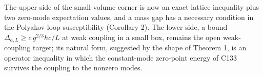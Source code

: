 \documentclass[11pt,a4paper]{article}
\begin{document}
The upper side of the small-volume corner is now an exact lattice
inequality plus two zero-mode expectation values, and a mass gap has a
necessary condition in the Polyakov-loop susceptibility (Corollary 2).
The lower side, a bound \(\Delta_{a,L}\ge c\,g^{2/3}\hbar c/L\) at weak
coupling in a small box, remains the open weak-coupling target; its
natural form, suggested by the shape of Theorem 1, is an operator
inequality in which the constant-mode zero-point energy of C133 survives
the coupling to the nonzero modes.
\end{document}
